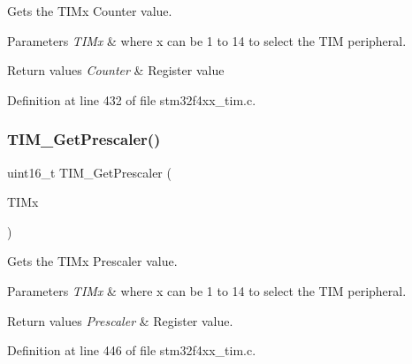 Gets the T\+I\+Mx Counter value. 


\begin{DoxyParams}{Parameters}
{\em T\+I\+Mx} & where x can be 1 to 14 to select the T\+IM peripheral. \\
\hline
\end{DoxyParams}

\begin{DoxyRetVals}{Return values}
{\em Counter} & Register value \\
\hline
\end{DoxyRetVals}


Definition at line 432 of file stm32f4xx\+\_\+tim.\+c.

\mbox{\label{group___t_i_m___group1_ga427eb6e533480e02a27cd0ca876183d6}} 
\subsubsection{\texorpdfstring{T\+I\+M\+\_\+\+Get\+Prescaler()}{TIM\_GetPrescaler()}}
{\footnotesize\ttfamily uint16\+\_\+t T\+I\+M\+\_\+\+Get\+Prescaler (\begin{DoxyParamCaption}\item[{\hyperlink{struct_t_i_m___type_def}{T\+I\+M\+\_\+\+Type\+Def} $\ast$}]{T\+I\+Mx }\end{DoxyParamCaption})}



Gets the T\+I\+Mx Prescaler value. 


\begin{DoxyParams}{Parameters}
{\em T\+I\+Mx} & where x can be 1 to 14 to select the T\+IM peripheral. \\
\hline
\end{DoxyParams}

\begin{DoxyRetVals}{Return values}
{\em Prescaler} & Register value. \\
\hline
\end{DoxyRetVals}


Definition at line 446 of file stm32f4xx\+\_\+tim.\+c.

\mbox{\label{group___t_i_m___group1_ga45c6fd9041baf7f64c121e0172f305c7}} 
